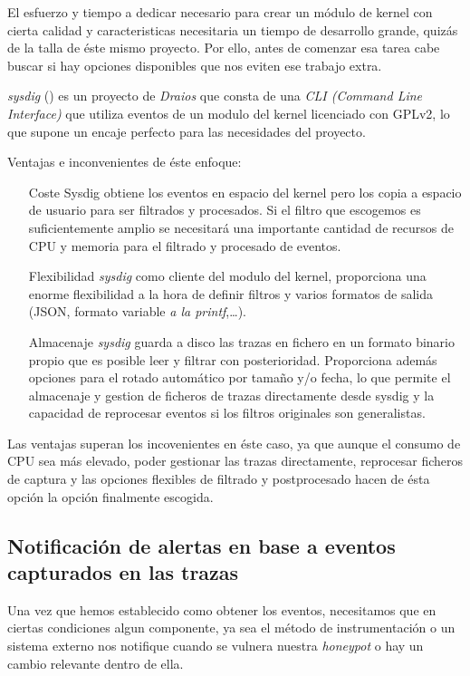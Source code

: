 El esfuerzo y tiempo a dedicar necesario para crear un módulo de kernel con cierta calidad y caracteristicas necesitaria un tiempo de desarrollo grande, quizás de la talla
de éste mismo proyecto. Por ello, antes de comenzar esa tarea cabe buscar si hay opciones disponibles que nos eviten ese trabajo extra.

\emph{sysdig} (\cite{sysdig-project}) es un proyecto de \emph{Draios} que consta de una \emph{CLI (Command Line Interface)} que utiliza eventos de un modulo del kernel
licenciado con GPLv2, lo que supone un encaje perfecto para las necesidades del proyecto.

Ventajas e inconvenientes de éste enfoque:

\begin{enumerate}
    \item[Coste] Sysdig obtiene los eventos en espacio del kernel pero los copia a espacio de usuario para ser
    filtrados y procesados. Si el filtro que escogemos es suficientemente amplio se necesitará una importante cantidad de recursos de CPU y memoria para el filtrado y procesado de eventos.
    \item[Flexibilidad] \emph{sysdig} como cliente del modulo del kernel, proporciona una enorme flexibilidad a la hora de definir filtros y varios formatos de salida (JSON, formato variable \emph{a la printf},\ldots).
    \item[Almacenaje] \emph{sysdig} guarda a disco las trazas en fichero en un formato binario propio que es posible leer y filtrar con posterioridad. Proporciona además opciones para el rotado automático por tamaño y/o fecha,
    lo que permite el almacenaje y gestion de ficheros de trazas directamente desde sysdig y la capacidad de reprocesar eventos si los filtros originales son generalistas. 
\end{enumerate}

Las ventajas superan los incovenientes en éste caso, ya que aunque el consumo de CPU sea más elevado, poder gestionar las trazas directamente, reprocesar ficheros de captura y las opciones flexibles de filtrado y postprocesado hacen de ésta opción la opción finalmente escogida.

\subsection{Notificación de alertas en base a eventos capturados en las trazas}

Una vez que hemos establecido como obtener los eventos, necesitamos que en ciertas condiciones algun componente, ya
sea el método de instrumentación o un sistema externo nos notifique cuando se vulnera nuestra \emph{honeypot} o hay un
cambio relevante dentro de ella.

